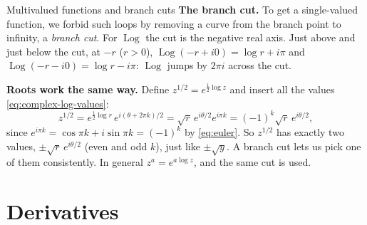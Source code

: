 \documentclass[11pt]{beamer}
\begin{document}
\begin{frame}[allowframebreaks=1.00]{Multivalued functions and branch cuts}
\textbf{The branch cut.} To get a single-valued function, we forbid such loops by removing a curve
from the branch point to infinity, a \emph{branch cut}. For \(\operatorname{Log}\) the cut is the
negative real axis. Just above and just below the cut, at \(-r\) (\(r>0\)),
\(\operatorname{Log}(-r+i0)=\log r+i\pi\) and \(\operatorname{Log}(-r-i0)=\log r-i\pi\): \(\operatorname{Log}\) jumps by \(2\pi i\) across the cut.

\textbf{Roots work the same way.} Define \(z^{1/2}=e^{\frac12\log z}\) and insert all the values
\eqref{eq:complex-log-values}:
\[
 z^{1/2}=e^{\frac12\log r}\,e^{i(\theta+2\pi k)/2}
       =\sqrt r\,e^{i\theta/2}e^{i\pi k}
       =(-1)^k\sqrt r\,e^{i\theta/2},
\]
since \(e^{i\pi k}=\cos\pi k+i\sin\pi k=(-1)^k\) by \eqref{eq:euler}. So \(z^{1/2}\) has exactly two
values, \(\pm\sqrt r\,e^{i\theta/2}\) (even and odd \(k\)), just like \(\pm\sqrt y\). A branch cut lets us
pick one of them consistently. In general \(z^a=e^{a\log z}\), and the same cut is used.
\end{frame}



\section{Derivatives}
\end{document}
